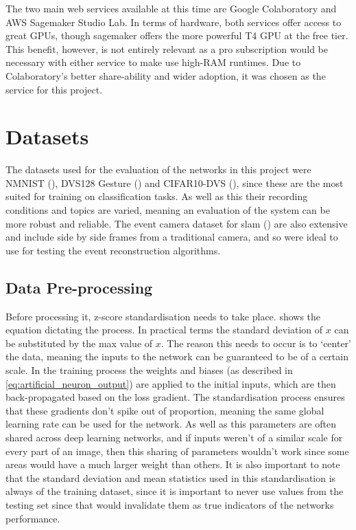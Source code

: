The two main web services available at this time are Google Colaboratory\cite{GoogleColab} and AWS Sagemaker Studio Lab\cite{AwsSagemaker}. In terms of hardware, both services offer access to great GPUs, though sagemaker offers the more powerful T4 GPU at the free tier. This benefit, however, is not entirely relevant as a pro subscription would be necessary with either service to make use high-RAM runtimes. Due to Colaboratory's better share-ability and wider adoption, it was chosen as the service for this project.

\section{Datasets}

The datasets used for the evaluation of the networks in this project were NMNIST (), DVS128 Gesture () and CIFAR10-DVS (), since these are the most suited for training on classification tasks. As well as this their recording conditions and topics are varied, meaning an evaluation of the system can be more robust and reliable. The event camera dataset for slam () are also extensive and include side by side frames from a traditional camera, and so were ideal to use for testing the event reconstruction algorithms.

\subsection{Data Pre-processing} \label{ssec:data_preprocessing_design}

Before processing it, z-score standardisation needs to take place.  shows the equation dictating the process. In practical terms the standard deviation of $ x $ can be substituted by the max value of $ x $. The reason this needs to occur is to `center' the data, meaning the inputs to the network can be guaranteed to be of a certain scale. In the training process the weights and biases (as described in \cref{eq:artificial_neuron_output}) are applied to the initial inputs, which are then back-propagated based on the loss gradient. The standardisation process ensures that these gradients don't spike out of proportion, meaning the same global learning rate can be used for the network. As well as this parameters are often shared across deep learning networks, and if inputs weren't of a similar scale for every part of an image, then this sharing of parameters wouldn't work since some areas would have a much larger weight than others. It is also important to note that the standard deviation and mean statistics used in this standardisation is always of the training dataset, since it is important to never use values from the testing set since that would invalidate them as true indicators of the networks performance.

